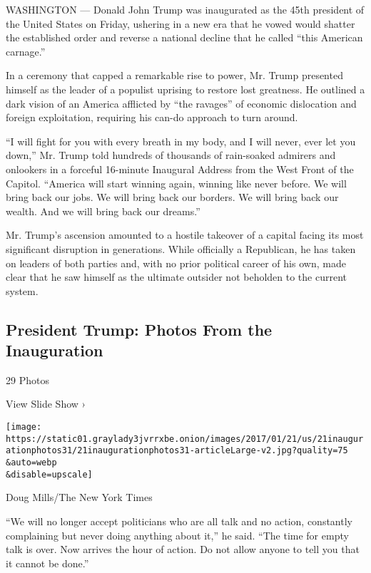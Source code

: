WASHINGTON --- Donald John Trump was inaugurated as the 45th president
of the United States on Friday, ushering in a new era that he vowed
would shatter the established order and reverse a national decline that
he called ``this American carnage.''

In a ceremony that capped a remarkable rise to power, Mr. Trump
presented himself as the leader of a populist uprising to restore lost
greatness. He outlined a dark vision of an America afflicted by ``the
ravages'' of economic dislocation and foreign exploitation, requiring
his can-do approach to turn around.

``I will fight for you with every breath in my body, and I will never,
ever let you down,'' Mr. Trump told hundreds of thousands of rain-soaked
admirers and onlookers in a forceful 16-minute Inaugural Address from
the West Front of the Capitol. ``America will start winning again,
winning like never before. We will bring back our jobs. We will bring
back our borders. We will bring back our wealth. And we will bring back
our dreams.''

Mr. Trump's ascension amounted to a hostile takeover of a capital facing
its most significant disruption in generations. While officially a
Republican, he has taken on leaders of both parties and, with no prior
political career of his own, made clear that he saw himself as the
ultimate outsider not beholden to the current system.

\href{https://www.nytimes3xbfgragh.onion/slideshow/2017/01/20/us/trump-inauguration-photos.html}{}

\hypertarget{president-trump-photos-from-the-inauguration}{%
\subsection{President Trump: Photos From the
Inauguration}\label{president-trump-photos-from-the-inauguration}}

29 Photos

View Slide Show ›

\texttt{[image: https://static01.graylady3jvrrxbe.onion/images/2017/01/21/us/21inaugurationphotos31/21inaugurationphotos31-articleLarge-v2.jpg?quality=75\\\&auto=webp\\\&disable=upscale]}

Doug Mills/The New York Times

``We will no longer accept politicians who are all talk and no action,
constantly complaining but never doing anything about it,'' he said.
``The time for empty talk is over. Now arrives the hour of action. Do
not allow anyone to tell you that it cannot be done.''


